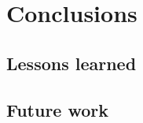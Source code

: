 \documentclass[../main.tex]{subfiles}
\begin{document}
    \chapter{Conclusions}
    \section{Lessons learned}
    \section{Future work}
\end{document}
